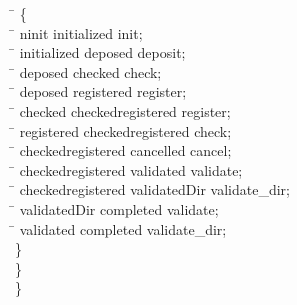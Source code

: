 \begin{program}
\>  \>  \=   \{\\
\>  \>  \>  \=    ninit  initialized  init;\\
\>  \>  \>  \=    initialized  deposed  deposit;\\
\>  \>  \>  \=    deposed  checked  check;\\
\>  \>  \>  \=    deposed  registered  register;\\
\>  \>  \>  \=    checked  checkedregistered  register;\\
\>  \>  \>  \=    registered  checkedregistered  check;\\
\>  \>  \>  \=    checkedregistered  cancelled  cancel;\\
\>  \>  \>  \=    checkedregistered  validated  validate;\\
\>  \>  \>  \=    checkedregistered  validatedDir  validate_dir;\\
\>  \>  \>  \=    validatedDir  completed  validate;\\
\>  \>  \>  \=    validated  completed  validate_dir;\\
\>  \>  \}\\
\>  \}\\
\}
\end{program}